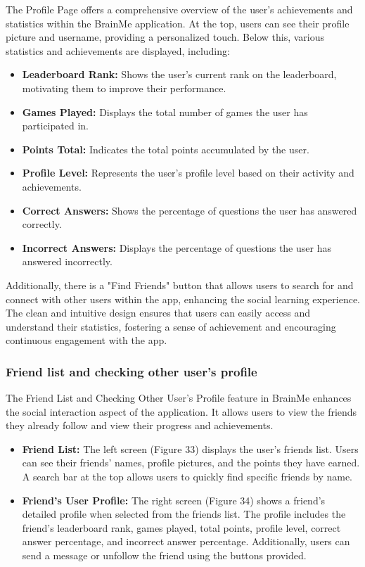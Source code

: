 The Profile Page offers a comprehensive overview of the user's achievements and statistics within the BrainMe application. At the top, users can see their profile picture and username, providing a personalized touch. Below this, various statistics and achievements are displayed, including:

\begin{itemize}
\item \textbf{Leaderboard Rank:} Shows the user's current rank on the leaderboard, motivating them to improve their performance.
\item \textbf{Games Played:} Displays the total number of games the user has participated in.
\item \textbf{Points Total:} Indicates the total points accumulated by the user.
\item \textbf{Profile Level:} Represents the user's profile level based on their activity and achievements.
\item \textbf{Correct Answers:} Shows the percentage of questions the user has answered correctly.
\item \textbf{Incorrect Answers:} Displays the percentage of questions the user has answered incorrectly.
\end{itemize}

Additionally, there is a "Find Friends" button that allows users to search for and connect with other users within the app, enhancing the social learning experience. The clean and intuitive design ensures that users can easily access and understand their statistics, fostering a sense of achievement and encouraging continuous engagement with the app.

\subsubsection{Friend list and checking other user's profile}

The Friend List and Checking Other User's Profile feature in BrainMe enhances the social interaction aspect of the application. It allows users to view the friends they already follow and view their progress and achievements.

\begin{itemize}
\item \textbf{Friend List:} The left screen (Figure 33) displays the user's friends list. Users can see their friends' names, profile pictures, and the points they have earned. A search bar at the top allows users to quickly find specific friends by name.
\item \textbf{Friend's User Profile:} The right screen (Figure 34) shows a friend's detailed profile when selected from the friends list. The profile includes the friend's leaderboard rank, games played, total points, profile level, correct answer percentage, and incorrect answer percentage. Additionally, users can send a message or unfollow the friend using the buttons provided.
\end{itemize}

